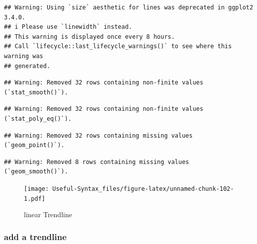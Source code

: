 \documentclass[
]{article}
\begin{document}
\begin{verbatim}
## Warning: Using `size` aesthetic for lines was deprecated in ggplot2 3.4.0.
## i Please use `linewidth` instead.
## This warning is displayed once every 8 hours.
## Call `lifecycle::last_lifecycle_warnings()` to see where this warning was
## generated.
\end{verbatim}

\begin{verbatim}
## Warning: Removed 32 rows containing non-finite values (`stat_smooth()`).
\end{verbatim}

\begin{verbatim}
## Warning: Removed 32 rows containing non-finite values (`stat_poly_eq()`).
\end{verbatim}

\begin{verbatim}
## Warning: Removed 32 rows containing missing values (`geom_point()`).
\end{verbatim}

\begin{verbatim}
## Warning: Removed 8 rows containing missing values (`geom_smooth()`).
\end{verbatim}

\begin{figure}
\centering
\texttt{[image: Useful-Syntax\_files/figure-latex/unnamed-chunk-102-1.pdf]}
\caption{\label{fig:unnamed-chunk-102}linear Trendline}
\end{figure}

\hypertarget{add-a-trendline-1}{%
\subsubsection{add a trendline}\label{add-a-trendline-1}}
\end{document}
